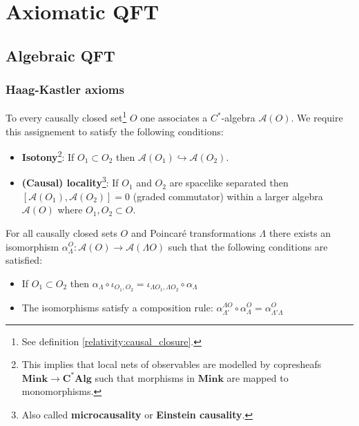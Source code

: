 \chapter{Axiomatic QFT}

\section{Algebraic QFT}
\subsection{Haag-Kastler axioms}

	\begin{axiom}\label{qft:microcausality}
		To every causally closed set\footnote{See definition \ref{relativity:causal_closure}.} $O$ one associates a $C^*$-algebra $\mathcal{A}(O)$. We require this assignement to satisfy the following conditions:
		\begin{itemize}
			\item \textbf{Isotony}\footnote{This implies that local nets of observables are modelled by copresheafs $\mathbf{Mink}\rightarrow\mathbf{C^*Alg}$ such that morphisms in $\mathbf{Mink}$ are mapped to monomorphisms.}: If $O_1\subset O_2$ then $\mathcal{A}(O_1)\hookrightarrow\mathcal{A}(O_2)$.
			\item \textbf{(Causal) locality}\footnote{Also called \textbf{microcausality} or \textbf{Einstein causality}.}: If $O_1$ and $O_2$ are spacelike separated then $[\mathcal{A}(O_1), \mathcal{A}(O_2)] = 0$ (graded commutator) within a larger algebra $\mathcal{A}(O)$ where $O_1, O_2\subset O$.
		\end{itemize}
	\end{axiom}
	
	\begin{axiom}
		For all causally closed sets $O$ and Poincar\'e transformations $\Lambda$ there exists an isomorphism $\alpha^O_\Lambda:\mathcal{A}(O)\rightarrow\mathcal{A}(\Lambda O)$ such that the following conditions are satisfied:
		\begin{itemize}
			\item If $O_1\subset O_2$ then $\alpha_\Lambda\circ\iota_{O_1,O_2} = \iota_{\Lambda O_1, \Lambda O_2}\circ\alpha_\Lambda$
			\item The isomorphisms satisfy a composition rule: $\alpha^{\Lambda O}_{\Lambda'}\circ\alpha^O_\Lambda = \alpha^O_{\Lambda'\Lambda}$
		\end{itemize}
	\end{axiom}
	
